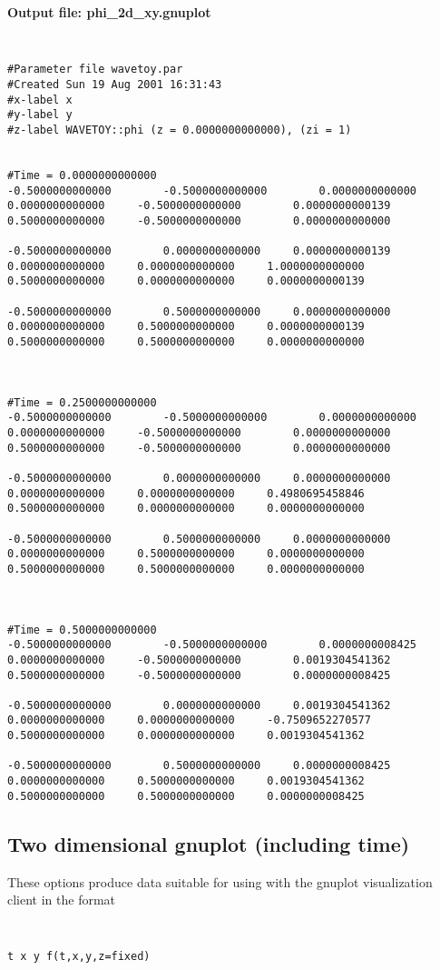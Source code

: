 \documentclass{article}
\begin{document}
\noindent
{\bf Output file: phi\_2d\_xy.gnuplot}
{\tt
\begin{verbatim}
#Parameter file wavetoy.par
#Created Sun 19 Aug 2001 16:31:43
#x-label x
#y-label y
#z-label WAVETOY::phi (z = 0.0000000000000), (zi = 1)


#Time = 0.0000000000000
-0.5000000000000		-0.5000000000000		0.0000000000000
0.0000000000000		-0.5000000000000		0.0000000000139
0.5000000000000		-0.5000000000000		0.0000000000000

-0.5000000000000		0.0000000000000		0.0000000000139
0.0000000000000		0.0000000000000		1.0000000000000
0.5000000000000		0.0000000000000		0.0000000000139

-0.5000000000000		0.5000000000000		0.0000000000000
0.0000000000000		0.5000000000000		0.0000000000139
0.5000000000000		0.5000000000000		0.0000000000000



#Time = 0.2500000000000
-0.5000000000000		-0.5000000000000		0.0000000000000
0.0000000000000		-0.5000000000000		0.0000000000000
0.5000000000000		-0.5000000000000		0.0000000000000

-0.5000000000000		0.0000000000000		0.0000000000000
0.0000000000000		0.0000000000000		0.4980695458846
0.5000000000000		0.0000000000000		0.0000000000000

-0.5000000000000		0.5000000000000		0.0000000000000
0.0000000000000		0.5000000000000		0.0000000000000
0.5000000000000		0.5000000000000		0.0000000000000



#Time = 0.5000000000000
-0.5000000000000		-0.5000000000000		0.0000000008425
0.0000000000000		-0.5000000000000		0.0019304541362
0.5000000000000		-0.5000000000000		0.0000000008425

-0.5000000000000		0.0000000000000		0.0019304541362
0.0000000000000		0.0000000000000		-0.7509652270577
0.5000000000000		0.0000000000000		0.0019304541362

-0.5000000000000		0.5000000000000		0.0000000008425
0.0000000000000		0.5000000000000		0.0019304541362
0.5000000000000		0.5000000000000		0.0000000008425
\end{verbatim}
}

\subsection{Two dimensional gnuplot (including time)}

These options produce data suitable for using with the gnuplot visualization client in the format
{\tt
\begin{verbatim}
t x y f(t,x,y,z=fixed)
\end{verbatim}
}
\end{document}
